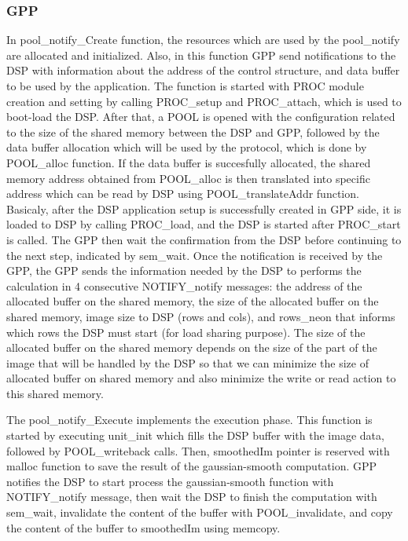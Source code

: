 \documentclass[conference]{IEEEtran}
\begin{document}
\subsubsection{GPP}
In pool\_notify\_Create function, the resources which are used by the pool\_notify are allocated and initialized. Also, in this function GPP send notifications to the DSP with information about the address of the control structure, and data buffer to be used by the application. The function is started with PROC module creation and setting by calling PROC\_setup and PROC\_attach, which is used to boot-load the DSP. After that, a POOL is opened with the configuration related to the size of the shared memory between the DSP and GPP, followed by the data buffer allocation which will be used by the protocol, which is done by POOL\_alloc function. If the data buffer is succesfully allocated, the shared memory address obtained from POOL\_alloc is then translated into specific address which can be read by DSP using POOL\_translateAddr function. Basicaly, after the DSP application setup is successfully created in GPP side, it is loaded to DSP by calling PROC\_load, and the DSP is started after PROC\_start is called. The GPP then wait the confirmation from the DSP before continuing to the next step, indicated by sem\_wait. Once the notification is received by the GPP, the GPP sends the information needed by the DSP to performs the calculation in 4 consecutive NOTIFY\_notify messages: the address of the allocated buffer on the shared memory, the size of the allocated buffer on the shared memory, image size to DSP (rows and cols), and rows\_neon that informs which rows the DSP must start (for load sharing purpose). The size of the allocated buffer on the shared memory depends on the size of the part of the image that will be handled by the DSP so that we can minimize the size of allocated buffer on shared memory and also minimize the write or read action to this shared memory. 

The pool\_notify\_Execute implements the execution phase. This function is started by executing unit\_init which fills the DSP buffer with the image data, followed by POOL\_writeback calls. Then, smoothedIm pointer is reserved with malloc function to save the result of the gaussian-smooth computation. GPP notifies the DSP to start process the gaussian-smooth function with NOTIFY\_notify message, then wait the DSP to finish the computation with sem\_wait, invalidate the content of the buffer with POOL\_invalidate, and copy the content of the buffer to smoothedIm using memcopy.
\end{document}
